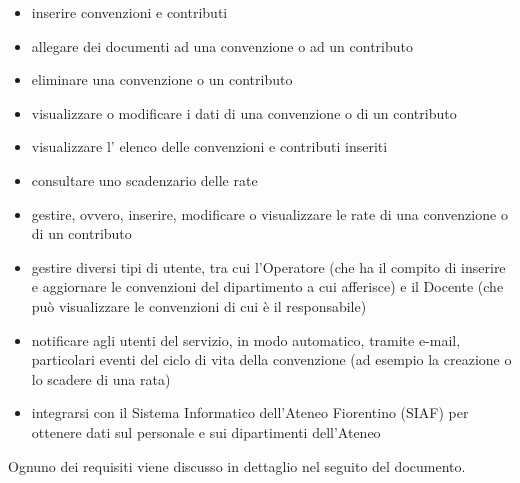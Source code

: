 \begin{itemize}
\item inserire convenzioni e contributi
\item allegare dei documenti ad una convenzione o ad un contributo
\item eliminare una convenzione o un contributo
\item visualizzare o modificare i dati di una convenzione o di un contributo
\item visualizzare l' elenco delle convenzioni e contributi inseriti
\item consultare uno scadenzario delle rate
\item gestire, ovvero, inserire, modificare o visualizzare le rate di una convenzione o di un contributo

\item gestire diversi tipi di utente, tra cui l'Operatore (che ha il compito di inserire e aggiornare le convenzioni del dipartimento a cui afferisce) e il Docente (che può visualizzare le convenzioni di cui è il responsabile)

\item notificare agli utenti del servizio, in modo automatico, tramite e-mail, particolari eventi del ciclo di vita della convenzione (ad esempio la creazione o lo scadere di una rata)
\item integrarsi con il Sistema Informatico dell'Ateneo Fiorentino (SIAF) per ottenere dati sul personale e sui dipartimenti dell'Ateneo
\end{itemize}

Ognuno dei requisiti viene discusso in dettaglio nel seguito del documento.

